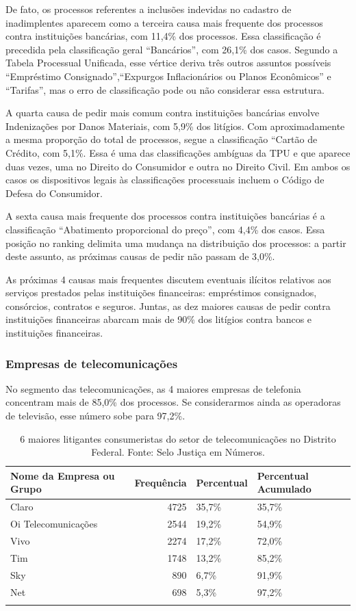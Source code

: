 \documentclass[]{report}
\begin{document}
De fato, os processos referentes a inclusões indevidas no cadastro de
inadimplentes aparecem como a terceira causa mais frequente dos
processos contra instituições bancárias, com 11,4\% dos processos. Essa
classificação é precedida pela classificação geral ``Bancários'', com
26,1\% dos casos. Segundo a Tabela Processual Unificada, esse vértice
deriva três outros assuntos possíveis ``Empréstimo
Consignado'',``Expurgos Inflacionários ou Planos Econômicos'' e
``Tarifas'', mas o erro de classificação pode ou não considerar essa
estrutura.

A quarta causa de pedir mais comum contra instituições bancárias envolve
Indenizações por Danos Materiais, com 5,9\% dos litígios. Com
aproximadamente a mesma proporção do total de processos, segue a
classificação ``Cartão de Crédito, com 5,1\%. Essa é uma das
classificações ambíguas da TPU e que aparece duas vezes, uma no Direito
do Consumidor e outra no Direito Civil. Em ambos os casos os
dispositivos legais às classificações processuais incluem o Código de
Defesa do Consumidor.

A sexta causa mais frequente dos processos contra instituições bancárias
é a classificação ``Abatimento proporcional do preço'', com 4,4\% dos
casos. Essa posição no ranking delimita uma mudança na distribuição dos
processos: a partir deste assunto, as próximas causas de pedir não
passam de 3,0\%.

As próximas 4 causas mais frequentes discutem eventuais ilícitos
relativos aos serviços prestados pelas instituições financeiras:
empréstimos consignados, consórcios, contratos e seguros. Juntas, as dez
maiores causas de pedir contra instituições financeiras abarcam mais de
90\% dos litígios contra bancos e instituições financeiras.

\subsubsection{Empresas de
telecomunicações}\label{empresas-de-telecomunicacoes-3}

No segmento das telecomunicações, as 4 maiores empresas de telefonia
concentram mais de 85,0\% dos processos. Se considerarmos ainda as
operadoras de televisão, esse número sobe para 97,2\%.

\begin{longtable}{lrll}
\caption{6 maiores litigantes consumeristas do setor de telecomunicações no Distrito Federal. Fonte: Selo Justiça em Números.} \\
  \hline
Nome da Empresa ou Grupo & Frequência & Percentual & Percentual Acumulado \\
  \hline
Claro & 4725 & 35,7\% & 35,7\% \\
  Oi
Telecomunicações & 2544 & 19,2\% & 54,9\% \\
  Vivo & 2274 & 17,2\% & 72,0\% \\
  Tim & 1748 & 13,2\% & 85,2\% \\
  Sky & 890 & 6,7\% & 91,9\% \\
  Net & 698 & 5,3\% & 97,2\% \\
   \hline
\hline
\label{unnamed-chunk-59}
\end{longtable}
\end{document}
